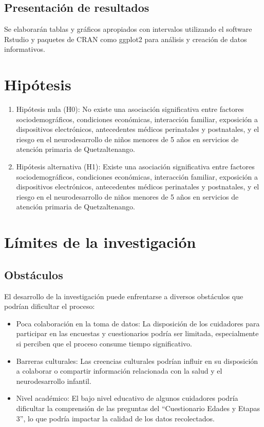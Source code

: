 \documentclass[11pt,letterpaper]{report}
\newcommand{\asq}{“Cuestionario Edades y Etapas 3”}
\begin{document}
\subsection{Presentación de resultados}
Se elaborarán tablas y gráficos apropiados con intervalos utilizando el
software Rstudio y paquetes de CRAN como ggplot2 para análisis y creación de
datos informativos.

\section{Hipótesis}
	\begin{enumerate}
		\item Hipótesis nula (H0): No existe una asociación significativa entre
		factores sociodemográficos, condiciones económicas, interacción
		familiar, exposición a dispositivos electrónicos, antecedentes médicos
		perinatales y postnatales, y el riesgo en el neurodesarrollo de niños
		menores de 5 años en servicios de atención primaria de Quetzaltenango.
		\item Hipótesis alternativa (H1): Existe una asociación significativa
		entre factores sociodemográficos, condiciones económicas, interacción
		familiar, exposición a dispositivos electrónicos, antecedentes médicos
		perinatales y postnatales, y el riesgo en el neurodesarrollo de niños
		menores de 5 años en servicios de atención primaria de Quetzaltenango.
	\end{enumerate}

\section{Límites de la investigación}
\subsection{Obstáculos}
El desarrollo de la investigación puede enfrentarse a diversos obstáculos que
podrían dificultar el proceso:

\begin{itemize}
    \item Poca colaboración en la toma de datos: La disposición de los
		cuidadores para participar en las encuestas y cuestionarios podría ser
		limitada, especialmente si perciben que el proceso consume tiempo
		significativo.
    \item Barreras culturales: Las creencias culturales podrían influir en su
		disposición a colaborar o compartir información relacionada con la
		salud y el neurodesarrollo infantil.
    \item Nivel académico: El bajo nivel educativo de algunos cuidadores podría
		dificultar la comprensión de las preguntas del \asq, lo que podría
		impactar la calidad de los datos recolectados.
\end{itemize}
\end{document}
